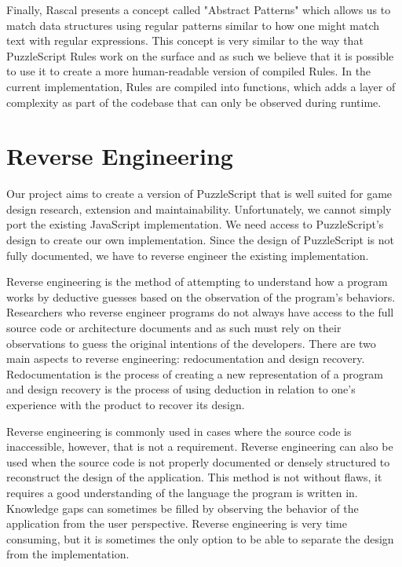 Finally, Rascal presents a concept called "Abstract Patterns" which allows us to match data structures using regular patterns similar to how one might match text with regular expressions. This concept is very similar to the way that PuzzleScript Rules work on the surface and as such we believe that it is possible to use it to create a more human-readable version of compiled Rules. In the current implementation, Rules are compiled into functions, which adds a layer of complexity as part of the codebase that can only be observed during runtime.  

\section{Reverse Engineering}
Our project aims to create a version of PuzzleScript that is well suited for game design research, extension and maintainability. Unfortunately, we cannot simply port the existing JavaScript implementation. We need access to PuzzleScript's design to create our own implementation. Since the design of PuzzleScript is not fully documented, we have to reverse engineer the existing implementation.

Reverse engineering is the method of attempting to understand how a program works by deductive guesses based on the observation of the program's behaviors\cite{10.1145/336512.336526}. Researchers who reverse engineer programs do not always have access to the full source code or architecture documents and as such must rely on their observations to guess the original intentions of the developers. There are two main aspects to reverse engineering: redocumentation and design recovery. Redocumentation is the process of creating a new representation of a program and design recovery is the process of using deduction in relation to one's experience with the product to recover its design\cite{43044}.

Reverse engineering is commonly used in cases where the source code is inaccessible, however, that is not a requirement. Reverse engineering can also be used when the source code is not properly documented or densely structured to reconstruct the design of the application. This method is not without flaws, it requires a good understanding of the language the program is written in. Knowledge gaps can sometimes be filled by observing the behavior of the application from the user perspective. Reverse engineering is very time consuming, but it is sometimes the only option to be able to separate the design from the implementation.

